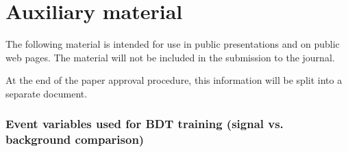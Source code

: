 \documentclass[PAPER, american,coverpage,texlive=2016, english]{\ATLASLATEXPATH atlasdoc}
\begin{document}
\printbibliography
%
%


\clearpage
\appendix
\part*{Auxiliary material}

The following material is intended for use in public presentations and on public web pages.
The material will not be included in the submission to the journal.

At the end of the paper approval procedure, this information will be split into a separate document.
%
\section{Event variables used for BDT training (signal vs. background comparison)}
\end{document}
